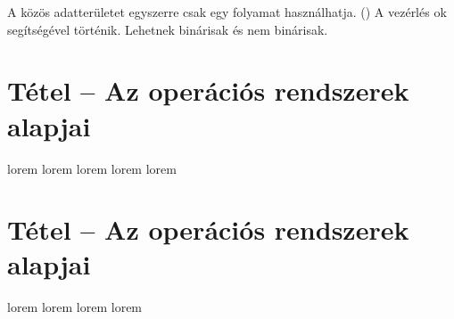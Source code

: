 \documentclass[main.tex]{subfiles}
\begin{document}
  A közös adatterületet egyszerre csak egy folyamat használhatja.
  () A vezérlés ok
  segítségével történik. Lehetnek binárisak és nem binárisak.
  
  
  \section{Tétel – Az operációs rendszerek alapjai} %
  

  lorem
  lorem
  lorem
  lorem
  lorem


  \section{Tétel – Az operációs rendszerek alapjai} %
  
  lorem
  lorem
  lorem
  lorem
\end{document}
